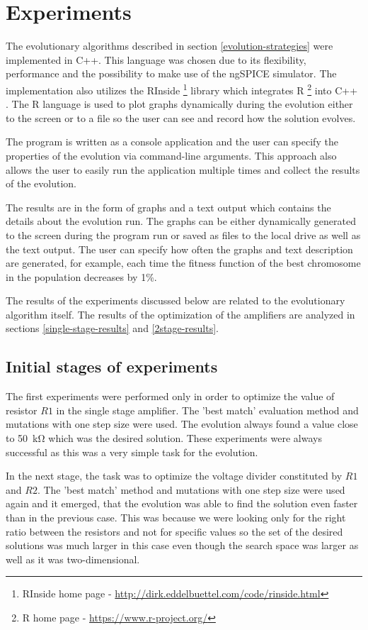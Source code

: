 \chapter{Experiments}
The evolutionary algorithms described in section \ref{evolution-strategies} were implemented in C++. This language was chosen due to its flexibility, performance and the possibility to make use of the ngSPICE simulator. The implementation also utilizes the RInside \footnote{RInside home page - \url{http://dirk.eddelbuettel.com/code/rinside.html}} library which integrates R \footnote{R home page - \url{https://www.r-project.org/}} into C++ \cite{Rcpp}. The R language is used to plot graphs dynamically during the evolution either to the screen or to a file so the user can see and record how the solution evolves.

The program is written as a console application and the user can specify the properties of the evolution via command-line arguments. This approach also allows the user to easily run the application multiple times and collect the results of the evolution.

The results are in the form of graphs and a text output which contains the details about the evolution run. The graphs can be either dynamically generated to the screen during the program run or saved as files to the local drive as well as the text output. The user can specify how often the graphs and text description are generated, for example, each time the fitness function of the best chromosome in the population decreases by 1\%.

The results of the experiments discussed below are related to the evolutionary algorithm itself. The results of the optimization of the amplifiers are analyzed in sections \ref{single-stage-results} and \ref{2stage-results}.

\section{Initial stages of experiments}
The first experiments were performed only in order to optimize the value of resistor $R1$ in the single stage amplifier. The 'best match' evaluation method and mutations with one step size were used. The evolution always found a value close to \SI{50}{\kilo\ohm} which was the desired solution. These experiments were always successful as this was a very simple task for the evolution.

In the next stage, the task was to optimize the voltage divider constituted by $R1$ and $R2$. The 'best match' method and mutations with one step size were used again and it emerged, that the evolution was able to find the solution even faster than in the previous case. This was because we were looking only for the right ratio between the resistors and not for specific values so the set of the desired solutions was much larger in this case even though the search space was larger as well as it was two-dimensional.

